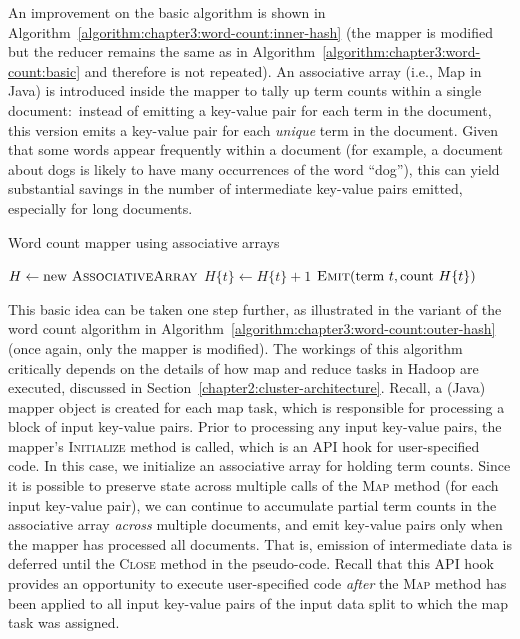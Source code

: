 An improvement on the basic algorithm is shown in
Algorithm~\ref{algorithm:chapter3:word-count:inner-hash} (the mapper is
modified but the reducer remains the same as in
Algorithm~\ref{algorithm:chapter3:word-count:basic} and therefore is not
repeated).  An associative array (i.e., Map in Java) is introduced
inside the mapper to tally up term counts within a single
document:\ instead of emitting a key-value pair for each term in the
document, this version emits a key-value pair for each \emph{unique}
term in the document.  Given that some words appear frequently within
a document (for example, a document about dogs is likely to have many
occurrences of the word ``dog''), this can yield substantial savings
in the number of intermediate key-value pairs emitted, especially for
long documents.

\begin{algorithm}[t]
  \caption{Word count mapper using associative arrays}
\label{algorithm:chapter3:word-count:inner-hash}
\algrenewcommand{}
\algrenewcommand{}
  \begin{algorithmic}[1]
    \State $H \gets \textrm{new }\textsc{AssociativeArray}$
      \State $H\{t\} \gets H\{t\} + 1$
    \EndFor
    \State $\textsc{Emit}(\textrm{term }t, \textrm{count }H\{t\} )$
    \EndFor
    \EndProcedure
    \EndFunction
  \end{algorithmic}
\end{algorithm}

This basic idea can be taken one step further, as illustrated in the
variant of the word count algorithm in
Algorithm~\ref{algorithm:chapter3:word-count:outer-hash} (once again, only
the mapper is modified).  The workings of this algorithm critically
depends on the details of how map and reduce tasks in Hadoop are
executed, discussed in Section~\ref{chapter2:cluster-architecture}.
Recall, a (Java) mapper object is created for each map task, which is
responsible for processing a block of input key-value pairs.  Prior to
processing any input key-value pairs, the mapper's \textsc{Initialize}
method is called, which is an API hook for user-specified code.  In
this case, we initialize an associative array for holding term counts.
Since it is possible to preserve state across multiple calls of the
\textsc{Map} method (for each input key-value pair), we can continue
to accumulate partial term counts in the associative array \emph{
  across} multiple documents, and emit key-value pairs only when the
mapper has processed all documents.  That is, emission of intermediate
data is deferred until the \textsc{Close} method in the pseudo-code.
Recall that this API hook provides an opportunity to execute
user-specified code \emph{after} the \textsc{Map} method has been
applied to all input key-value pairs of the input data split to which
the map task was assigned.

